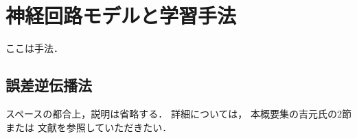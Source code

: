 \section{神経回路モデルと学習手法}
ここは手法．

\subsection{誤差逆伝播法}
スペースの都合上，説明は省略する．
詳細については，
本概要集の吉元氏の2節または
文献\cite{amari89a}を参照していただきたい．

